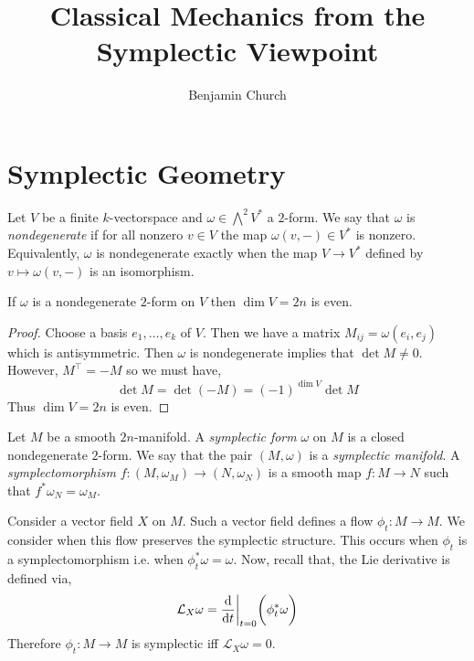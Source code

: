 \documentclass[12pt]{extarticle}
\renewcommand{\L}{\mathcal{L}}
\begin{document}
\author{Benjamin Church}
\title{\Huge Classical Mechanics from the Symplectic Viewpoint}

\maketitle
\tableofcontents
\newpage

\section{Symplectic Geometry}

\begin{defn}
Let $V$ be a finite $k$-vectorspace and $\omega \in \bigwedge^2 V^*$ a $2$-form. We say that $\omega$ is \textit{nondegenerate} if for all nonzero $v \in V$ the map $\omega(v, -) \in V^*$ is nonzero. Equivalently, $\omega$ is nondegenerate exactly when the map $V \to V^*$ defined by $v \mapsto \omega(v, -)$ is an isomorphism. 
\end{defn}

\begin{lemma}
If $\omega$ is a nondegenerate $2$-form on $V$ then $\dim{V} = 2n$ is even.
\end{lemma}

\begin{proof}
Choose a basis $e_1, \dots, e_k$ of $V$. Then we have a matrix $M_{ij} = \omega(e_i, e_j)$ which is antisymmetric. Then $\omega$ is nondegenerate implies that $\det{M} \neq 0$. However, $M^\top = - M$ so we must have,
\[ \det{M} = \det{(-M)} = (-1)^{\dim{V}} \det{M} \]
Thus $\dim{V} = 2n$ is even.
\end{proof}

\begin{defn}
Let $M$ be a smooth $2n$-manifold. A \textit{symplectic form} $\omega$ on $M$ is a closed nondegenerate $2$-form. We say that the pair $(M, \omega)$ is a \textit{symplectic manifold}. A \textit{symplectomorphism} $f : (M, \omega_M) \to (N, \omega_N)$ is a smooth map $f : M \to N$ such that $f^* \omega_N = \omega_M$. 
\end{defn}

\begin{rmk}
Consider a vector field $X$ on $M$. Such a vector field defines a flow $\phi_t : M \to M$. We consider when this flow preserves the symplectic structure. This occurs when $\phi_t$ is a symplectomorphism i.e. when $\phi_t^* \omega = \omega$. Now, recall that, the Lie derivative is defined via,
\[ \L_X \omega = \deriv{}{t} \bigg|_{t = 0} \bigg( \phi^*_t \omega \bigg) \]
Therefore $\phi_t : M \to M$ is symplectic iff $\L_X \omega = 0$.
\end{rmk}
\end{document}

